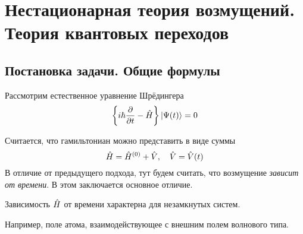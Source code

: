 \section{Нестационарная теория возмущений. Теория квантовых переходов}
\subsection{Постановка задачи. Общие формулы}
Рассмотрим естественное уравнение Шрёдингера
\def \pd{\partial}
\begin{equation}
   \left\{ i \hbar \dfrac{\pd}{\pd t} - \hat H \right\} \qu{\Psi(t)} = 0
   \label{eq::schrodinger}
\end{equation}

Считается, что гамильтониан можно представить в виде суммы
$$
    \Hat H = \Hat H^{(0)} + \Hat V, \quad\hat  V = \hat V(t)
$$
В отличие от предыдущего подхода, тут будем считать, что возмущение \emph{зависит от времени}. В этом заключается основное отличие.

Зависимость $\Hat H$ от времени характерна для незамкнутых систем.

Например, поле атома, взаимодействующее с внешним полем волнового типа.

